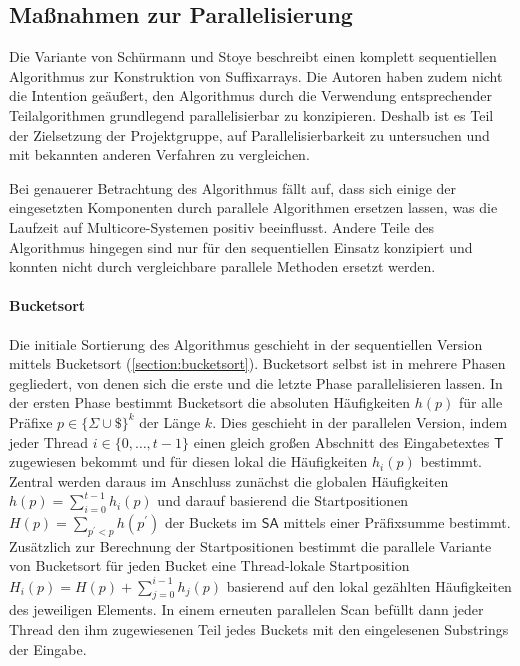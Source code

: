 \subsection{Maßnahmen zur Parallelisierung}
\label{bpr:parallelisierung}

Die \bpr Variante von Schürmann und Stoye \cite{saca:2} beschreibt einen komplett sequentiellen Algorithmus zur Konstruktion von {Suf\-fix\-arrays}.
Die Autoren haben zudem nicht die Intention geäußert, den Algorithmus durch die Verwendung entsprechender Teilalgorithmen grundlegend parallelisierbar zu konzipieren.
Deshalb ist es Teil der Zielsetzung der Projektgruppe, \bpr auf Parallelisierbarkeit zu untersuchen und mit bekannten anderen Verfahren zu vergleichen.\par\smallskip
Bei genauerer Betrachtung des Algorithmus fällt auf, dass sich einige der eingesetzten Komponenten durch parallele Algorithmen ersetzen lassen, was die Laufzeit auf Multicore-Systemen positiv beeinflusst.
Andere Teile des Algorithmus hingegen sind nur für den sequentiellen Einsatz konzipiert und konnten nicht durch vergleichbare parallele Methoden ersetzt werden.

\paragraph{Bucketsort}
Die initiale Sortierung des \bpr Algorithmus geschieht in der sequentiellen Version mittels Bucketsort (\cref{section:bucketsort}).
Bucketsort selbst ist in mehrere Phasen gegliedert, von denen sich die erste und die letzte Phase parallelisieren lassen.
In der ersten Phase bestimmt Bucketsort die absoluten Häufigkeiten \(h(p)\) für alle Präfixe \(p \in \{\Sigma \cup \$\}^k\) der Länge \(k\).
Dies geschieht in der parallelen Version, indem jeder Thread \(i \in \{0, \ldots, t-1\}\) einen gleich großen Abschnitt des Eingabetextes \(\mathsf{T}\) zugewiesen bekommt und für diesen lokal die Häufigkeiten \(h_i(p)\) bestimmt.
Zentral werden daraus im Anschluss zunächst die globalen Häufigkeiten \(h(p) = \sum_{i=0}^{t-1} h_i(p)\) und darauf basierend die Startpositionen \(H(p) = \sum_{p^\prime < p} h(p^\prime)\) der Buckets im \(\mathsf{SA}\) mittels einer Präfixsumme bestimmt.
Zusätzlich zur Berechnung der Startpositionen bestimmt die parallele Variante von Bucketsort für jeden Bucket eine Thread-lokale Startposition \(H_i(p) = H(p) + \sum_{j=0}^{i-1} h_j(p)\) basierend auf den lokal gezählten Häufigkeiten des jeweiligen Elements.
In einem erneuten parallelen Scan befüllt dann jeder Thread den ihm zugewiesenen Teil jedes Buckets mit den eingelesenen Substrings der Eingabe.

